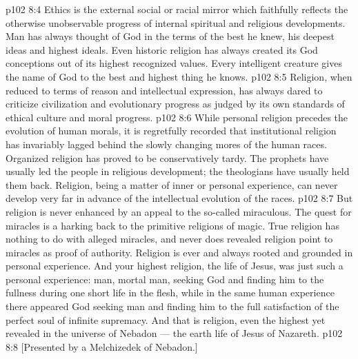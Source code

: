 \vs p102 8:4 \pc Ethics is the external social or racial mirror which faithfully reflects the otherwise unobservable progress of internal spiritual and religious developments. Man has always thought of God in the terms of the best he knew, his deepest ideas and highest ideals. Even historic religion has always created its God conceptions out of its highest recognized values. Every intelligent creature gives the name of God to the best and highest thing he knows.
\vs p102 8:5 Religion, when reduced to terms of reason and intellectual expression, has always dared to criticize civilization and evolutionary progress as judged by its own standards of ethical culture and moral progress.
\vs p102 8:6 While personal religion precedes the evolution of human morals, it is regretfully recorded that institutional religion has invariably lagged behind the slowly changing mores of the human races. Organized religion has proved to be conservatively tardy. The prophets have usually led the people in religious development; the theologians have usually held them back. Religion, being a matter of inner or personal experience, can never develop very far in advance of the intellectual evolution of the races.
\vs p102 8:7 But religion is never enhanced by an appeal to the so\hyp{}called miraculous. The quest for miracles is a harking back to the primitive religions of magic. True religion has nothing to do with alleged miracles, and never does revealed religion point to miracles as proof of authority. Religion is ever and always rooted and grounded in personal experience. And your highest religion, the life of Jesus, was just such a personal experience: man, mortal man, seeking God and finding him to the fullness during one short life in the flesh, while in the same human experience there appeared God seeking man and finding him to the full satisfaction of the perfect soul of infinite supremacy. And that is religion, even the highest yet revealed in the universe of Nebadon --- the earth life of Jesus of Nazareth.
\vsetoff
\vs p102 8:8 [Presented by a Melchizedek of Nebadon.]
